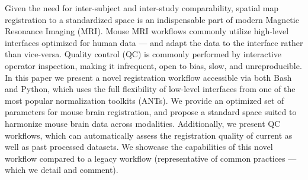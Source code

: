 Given the need for inter-subject and inter-study comparability, spatial map registration to a standardized space is an indispensable part of modern Magnetic Resonance Imaging (MRI).
Mouse MRI workflows commonly utilize high-level interfaces optimized for human data --- and adapt the data to the interface rather than vice-versa.
Quality control (QC) is commonly performed by interactive operator inspection, making it infrequent, open to bias, slow, and unreproducible.
In this paper we present a novel registration workflow accessible via both Bash and Python, which uses the full flexibility of low-level interfaces from one of the most popular normalization toolkits (ANTs).
We provide an optimized set of parameters for mouse brain registration, and propose a standard space suited to harmonize mouse brain data across modalities.
Additionally, we present QC workflows, which can automatically assess the registration quality of current as well as past processed datasets.
We showcase the capabilities of this novel workflow compared to a legacy workflow (representative of common practices --- which we detail and comment).
